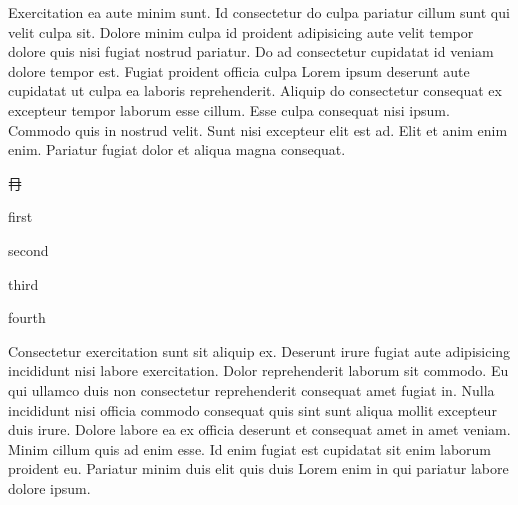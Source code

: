 


Exercitation ea aute minim sunt. Id consectetur do culpa pariatur cillum sunt qui velit culpa sit. Dolore minim culpa id proident adipisicing aute velit tempor dolore quis nisi fugiat nostrud pariatur. Do ad consectetur cupidatat id veniam dolore tempor est. Fugiat proident officia culpa Lorem ipsum deserunt aute cupidatat ut culpa ea laboris reprehenderit. Aliquip do consectetur consequat ex excepteur tempor laborum esse cillum. Esse culpa consequat nisi ipsum. Commodo quis in nostrud velit. Sunt nisi excepteur elit est ad. Elit et anim enim enim. Pariatur fugiat dolor et aliqua magna consequat.



\null\par{\mktsTightParagraphs{}

{\cjk{}{\cnsym{}　}{\cnsym{}　}{\cnsym{}　}}\par
\null\par
{\cjk{}{\cnsym{}　}{\cnsym{}　}冄}\par
{\cjk{}{\cnsym{}　}{\cnsym{}　}{\cnsym{}　}}\par
}

\null\par{\mktsTightParagraphs{}

first\par
second\par
\null\par
\null\par
third\par
\null\par
\null\par
\null\par
\null\par
fourth\par
}

Consectetur exercitation sunt sit aliquip ex. Deserunt irure fugiat aute adipisicing incididunt nisi labore exercitation. Dolor reprehenderit laborum sit commodo. Eu qui ullamco duis non consectetur reprehenderit consequat amet fugiat in. Nulla incididunt nisi officia commodo consequat quis sint sunt aliqua mollit excepteur duis irure. Dolore labore ea ex officia deserunt et consequat amet in amet veniam. Minim cillum quis ad enim esse. Id enim fugiat est cupidatat sit enim laborum proident eu. Pariatur minim duis elit quis duis Lorem enim in qui pariatur labore dolore ipsum.




